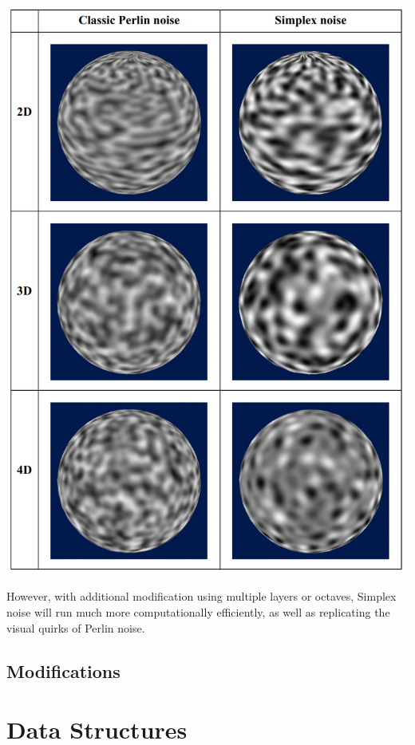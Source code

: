 \documentclass[10pt]{report}
\begin{document}
		\begin{minipage}{\textwidth}
			\centering
			\includegraphics[scale=.2]{perlin vs simplex}
			\label{fig:fig4}
		\end{minipage}
		
		However, with additional modification using multiple layers or octaves, Simplex noise will run much more computationally efficiently, as well as replicating the visual quirks of Perlin noise.
		
		\section{Modifications}
		
		
	\vspace{10pt}
	\let\clearpage\relax
	\chapter{Data Structures} \label{chap:data_structures}
	
\end{document}
